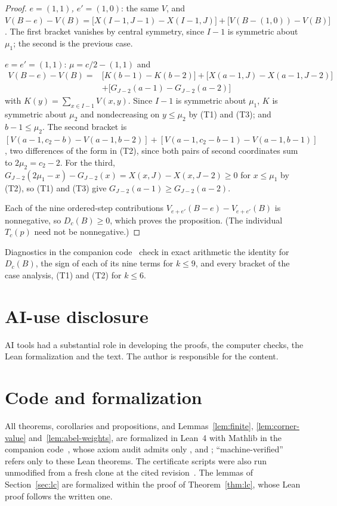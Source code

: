 \begin{proof}
\emph{$e=(1,1)$, $e'=(1,0)$}: the same $V$, and $V(B-e)-V(B)=\bigl[X(I-1,J-1)-X(I-1,J)\bigr]+\bigl[V(B-(1,0))-V(B)\bigr]$. The first bracket vanishes by central symmetry, since $I-1$ is symmetric about $\mu_1$; the second is the previous case.

\emph{$e=e'=(1,1)$}: $\mu=c/2-(1,1)$ and
\[
\begin{aligned}
V(B-e)-V(B)={}&\bigl[K(b-1)-K(b-2)\bigr]+\bigl[X(a-1,J)-X(a-1,J-2)\bigr]\\
&+\bigl[G_{J-2}(a-1)-G_{J-2}(a-2)\bigr]
\end{aligned}
\]
with $K(y)=\sum_{x\in I-1}V(x,y)$. Since $I-1$ is symmetric about $\mu_1$, $K$ is symmetric about $\mu_2$ and nondecreasing on $y\leq\mu_2$ by (T1) and (T3); and $b-1\leq\mu_2$. The second bracket is $[V(a-1,c_2-b)-V(a-1,b-2)]+[V(a-1,c_2-b-1)-V(a-1,b-1)]$, two differences of the form in (T2), since both pairs of second coordinates sum to $2\mu_2=c_2-2$. For the third, $G_{J-2}(2\mu_1-x)-G_{J-2}(x)=X(x,J)-X(x,J-2)\geq0$ for $x\leq\mu_1$ by (T2), so (T1) and (T3) give $G_{J-2}(a-1)\geq G_{J-2}(a-2)$.

Each of the nine ordered-step contributions $V_{e+e'}(B-e)-V_{e+e'}(B)$ is nonnegative, so $D_c(B)\geq0$, which proves the proposition. (The individual $T_c(p)$ need not be nonnegative.)
\end{proof}

Diagnostics in the companion code~\cite{code} check in exact arithmetic the identity for $D_c(B)$, the sign of each of its nine terms for $k\leq9$, and every bracket of the case analysis, (T1) and (T2) for $k\leq6$.

\section*{AI-use disclosure}

AI tools had a substantial role in developing the proofs, the computer checks, the Lean formalization and the text. The author is responsible for the content.

\section*{Code and formalization}

All theorems, corollaries and propositions, and Lemmas~\ref{lem:finite}, \ref{lem:corner-value} and~\ref{lem:abel-weights}, are formalized in Lean~4 with Mathlib in the companion code~\cite{code}, whose axiom audit admits only ,  and ; ``machine-verified'' refers only to these Lean theorems. The certificate scripts were also run unmodified from a fresh clone at the cited revision~\cite{docs}. The lemmas of Section~\ref{sec:lc} are formalized within the proof of Theorem~\ref{thm:lc}, whose Lean proof follows the written one.

